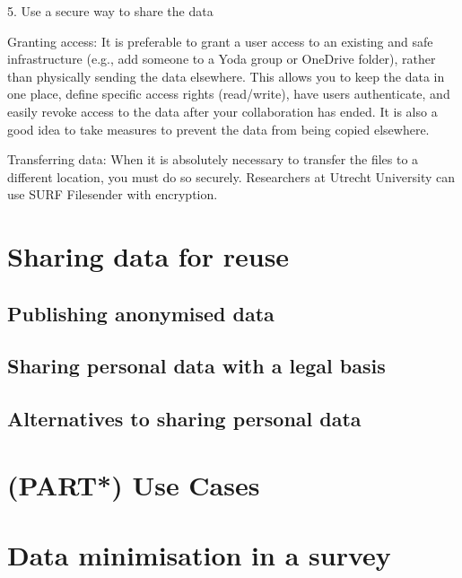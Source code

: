 \documentclass[
]{book}
\begin{document}
5. Use a secure way to share the data

Granting access: It is preferable to grant a user access
to an existing and safe infrastructure (e.g., add someone to a Yoda
group or OneDrive folder), rather than physically sending the data
elsewhere. This allows you to keep the data in one place, define
specific access rights (read/write), have users authenticate, and
easily revoke access to the data after your collaboration has ended.
It is also a good idea to take measures to prevent the data from
being copied elsewhere.

Transferring data: When it is absolutely necessary to
transfer the files to a different location, you must do so securely.
Researchers at Utrecht University can use
SURF Filesender
with encryption.

\hypertarget{data-sharing-reuse}{%
\chapter{Sharing data for reuse}\label{data-sharing-reuse}}

\hypertarget{publish-anonymous-data}{%
\section{Publishing anonymised data}\label{publish-anonymous-data}}

\hypertarget{share-reuse-legal-basis}{%
\section{Sharing personal data with a legal basis}\label{share-reuse-legal-basis}}

\hypertarget{sharing-reuse-alternatives}{%
\section{Alternatives to sharing personal data}\label{sharing-reuse-alternatives}}

\hypertarget{part-use-cases}{%
\chapter{(PART*) Use Cases}\label{part-use-cases}}

\hypertarget{pet-survey}{%
\chapter{Data minimisation in a survey}\label{pet-survey}}
\end{document}
